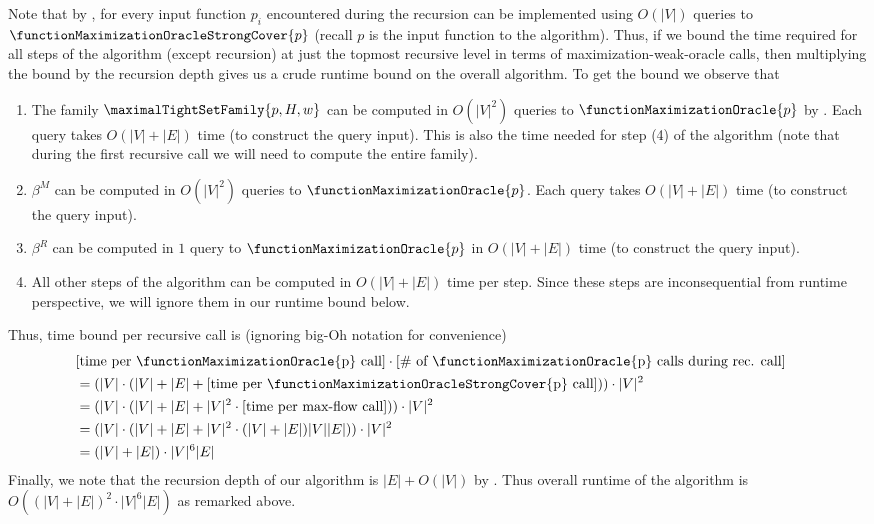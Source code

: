 {    Note that by ,  for every input function $p_i$ encountered during the recursion can be implemented using $O(|V|)$ queries to $\functionMaximizationOracleStrongCover{p}$ (recall $p$ is the input function to the algorithm). Thus,  if we bound the time required for all steps of the algorithm (except recursion) at just the topmost recursive level in terms of maximization-weak-oracle calls, then multiplying the bound by the recursion depth gives us a crude runtime bound on the overall algorithm. To get the bound we observe that
    \begin{enumerate}
    \item The family $\maximalTightSetFamily{p, H, w}$ can be computed in $O(|V|^2)$ queries to $\functionMaximizationOracle{p}$ by . Each query takes $O(|V| + |E|)$ time (to construct the query input).
     This is also the time needed for step (4) of the algorithm (note that during the first recursive call we will need to compute the entire family).
    \item $\beta^M$ can be computed in $O(|V|^2)$ queries to $\functionMaximizationOracle{p}$. Each query takes $O(|V| + |E|)$ time (to construct the query input).
    \item $\beta^R$ can be computed in $1$ query to $\functionMaximizationOracle{p}$ in $O(|V| + |E|)$ time (to construct the query input).
    \item All other steps of the algorithm can be computed in $O(|V| + |E|)$ time per step. Since these steps are inconsequential from runtime perspective, we will ignore them in our runtime bound below.
\end{enumerate}
Thus, time bound per recursive call is (ignoring big-Oh notation for convenience)
\begin{align*}
    &[\text{time per  \functionMaximizationOracle{p} call}] \cdot [\text{$\#$ of  \functionMaximizationOracle{p} calls during rec. call}] &\\
    & = (|V| \cdot (|V| + |E| + [\text{time per  \functionMaximizationOracleStrongCover{p} call}])) \cdot |V|^2&\\
    &= (|V| \cdot (|V| + |E| + |V|^2\cdot[\text{time per max-flow call}])) \cdot |V|^2&\\
    &= (|V| \cdot (|V| + |E| + |V|^2\cdot(|V|+|E|)|V||E|)) \cdot |V|^2&\\
    & = (|V| + |E|)\cdot|V|^{6}|E|&
\end{align*}
Finally, we note that the recursion depth of our algorithm is $|E| + O(|V|)$ by . Thus overall runtime of the algorithm is $O((|V| + |E|)^2\cdot|V|^{6}|E|)$ as remarked above.
}
\fi

